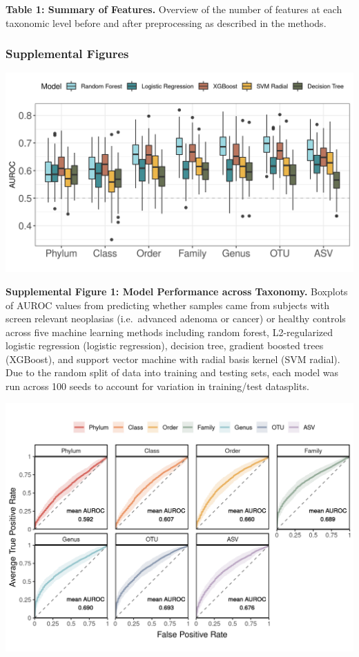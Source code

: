 \documentclass[
]{article}
\begin{document}
\textbf{Table 1: Summary of Features.} Overview of the number of
features at each taxonomic level before and after preprocessing as
described in the methods.

\newpage

\hypertarget{supplemental-figures}{%
\subsubsection{Supplemental Figures}\label{supplemental-figures}}

\includegraphics{figure_s1.png}

\textbf{Supplemental Figure 1: Model Performance across Taxonomy.}
Boxplots of AUROC values from predicting whether samples came from
subjects with screen relevant neoplasias (i.e.~advanced adenoma or
cancer) or healthy controls across five machine learning methods
including random forest, L2-regularized logistic regression (logistic
regression), decision tree, gradient boosted trees (XGBoost), and
support vector machine with radial basis kernel (SVM radial). Due to the
random split of data into training and testing sets, each model was run
across 100 seeds to account for variation in training/test datasplits.

\newpage

\includegraphics[width=\textwidth,height=0.5\textheight]{figure_s2.png}
\end{document}
